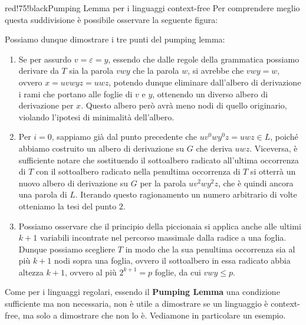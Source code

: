 \begin{halfframedbox}{red!75!black}{Pumping Lemma per i linguaggi context-free}
  Per comprendere meglio questa suddivisione è possibile osservare la seguente figura:

  Possiamo dunque dimostrare i tre punti del pumping lemma:
  \begin{enumerate}
    \item Se per assurdo $v = \varepsilon = y$, essendo che dalle regole della grammatica possiamo derivare da $T$ sia la parola $vwy$ che la parola $w$, si avrebbe che $vwy=w$, ovvero $x=uvwyz=uwz$, potendo dunque eliminare dall'albero di derivazione i rami che portano alle foglie di $v$ e $y$, ottenendo un diverso albero di derivazione per $x$. Questo albero però avrà meno nodi di quello originario, violando l'ipotesi di minimalità dell'albero.
      
    \item Per $i=0$, sappiamo già dal punto precedente che $uv^{0}wy^{0}z=uwz \in L$, poiché abbiamo costruito un albero di derivazione su $G$ che deriva $uwz$. Viceversa, è sufficiente notare che sostituendo il sottoalbero radicato all'ultima occorrenza di $T$ con il sottoalbero radicato nella penultima occorrenza di $T$ si otterrà un nuovo albero di derivazione su $G$ per la parola $uv^{2}wy^{2}z$, che è quindi ancora una parola di $L$. Iterando questo ragionamento un numero arbitrario di volte otteniamo la tesi del punto $2$.

    \item Possiamo osservare che il principio della piccionaia si applica anche alle ultimi $k+1$ variabili incontrate nel percorso massimale dalla radice a una foglia. Dunque possiamo scegliere $T$ in modo che la sua penultima occorrenza sia al più $k+1$ nodi sopra una foglia, ovvero il sottoalbero in essa radicato abbia altezza $k+1$, ovvero al più $2^{k+1}=p$ foglie, da cui $vwy\leq p$.
  \end{enumerate}

\end{halfframedbox}

Come per i linguaggi regolari, essendo il \textbf{Pumping Lemma} una condizione sufficiente ma non necessaria, non è utile a dimostrare se un linguaggio è context-free, ma solo a dimostrare che non lo è. Vediamone in particolare un esempio.

